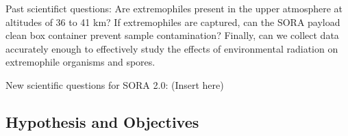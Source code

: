 Past scientifict questions:
 Are extremophiles present in the upper atmosphere at altitudes of 36 to 41 km?  If extremophiles are captured, can the SORA payload clean box container prevent sample contamination? Finally, can we collect data accurately enough to effectively study the effects of environmental radiation on extremophile organisms and spores.
 
 New scientific questions for SORA 2.0:
(Insert here)

\subsection{Hypothesis and Objectives}
\label{subsec:Hypothesis and Objectives}
\begin{enumerate}

\end{enumerate}
